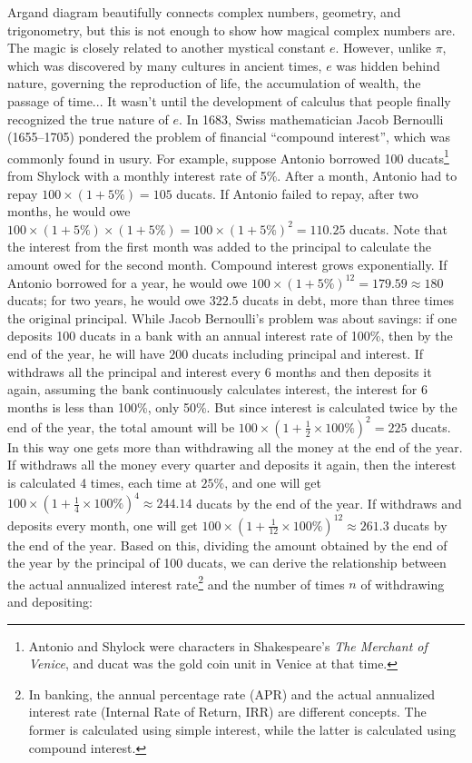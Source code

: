 \documentclass[b5paper]{article}
\begin{document}
 
Argand diagram beautifully connects complex numbers, geometry, and trigonometry, but this is not enough to show how magical complex numbers are. The magic is closely related to another mystical constant $e$. However, unlike $\pi$, which was discovered by many cultures in ancient times, $e$ was hidden behind nature, governing the reproduction of life, the accumulation of wealth, the passage of time... It wasn't until the development of calculus that people finally recognized the true nature of $e$. In 1683, Swiss mathematician Jacob Bernoulli (1655–1705) pondered the problem of financial \enquote{compound interest}, which was commonly found in usury. For example, suppose Antonio borrowed 100 ducats\footnote{Antonio and Shylock were characters in Shakespeare's \emph{The Merchant of Venice}, and ducat was the gold coin unit in Venice at that time.} from Shylock with a monthly interest rate of 5\%. After a month, Antonio had to repay $100 \times (1 + 5\%) = 105$ ducats. If Antonio failed to repay, after two months, he would owe $100 \times (1 + 5\%) \times (1 + 5\%) = 100 \times (1 + 5\%)^2 = 110.25$ ducats. Note that the interest from the first month was added to the principal to calculate the amount owed for the second month. Compound interest grows exponentially. If Antonio borrowed for a year, he would owe $100 \times (1 + 5\%)^{12} = 179.59 \approx 180$ ducats; for two years, he would owe $322.5$ ducats in debt, more than three times the original principal. While Jacob Bernoulli's problem was about savings: if one deposits 100 ducats in a bank with an annual interest rate of 100\%, then by the end of the year, he will have $200$ ducats including principal and interest. If withdraws all the principal and interest every 6 months and then deposits it again, assuming the bank continuously calculates interest, the interest for 6 months is less than 100\%, only 50\%. But since interest is calculated twice by the end of the year, the total amount will be $100 \times (1 + \frac{1}{2} \times 100\%)^2 = 225$ ducats. In this way one gets more than withdrawing all the money at the end of the year. If withdraws all the money every quarter and deposits it again, then the interest is calculated 4 times, each time at $25\%$, and one will get $100 \times (1 + \frac{1}{4} \times 100\%)^4 \approx 244.14$ ducats by the end of the year. If withdraws and deposits every month, one will get $100 \times (1 + \frac{1}{12} \times 100\%)^{12} \approx 261.3$ ducats by the end of the year. Based on this, dividing the amount obtained by the end of the year by the principal of 100 ducats, we can derive the relationship between the actual annualized interest rate\footnote{In banking, the annual percentage rate (APR) and the actual annualized interest rate (Internal Rate of Return, IRR) are different concepts. The former is calculated using simple interest, while the latter is calculated using compound interest.} and the number of times $n$ of withdrawing and depositing:
\end{document}
